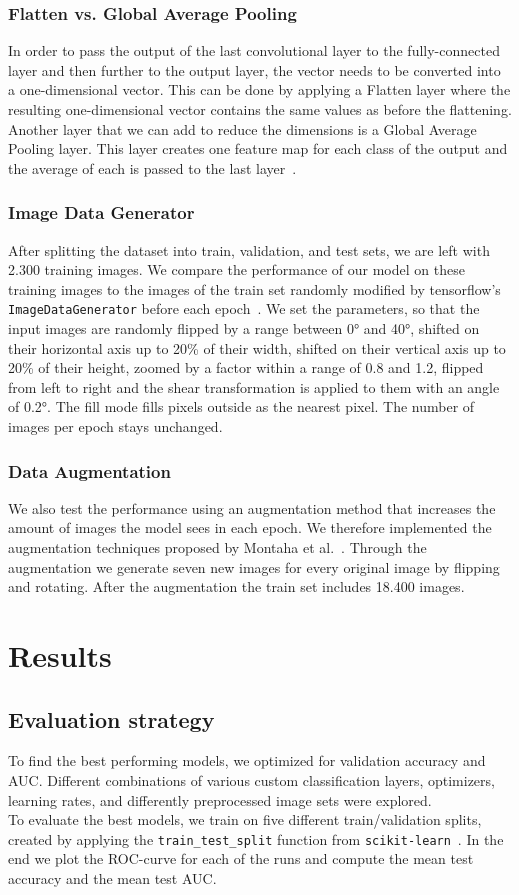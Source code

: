 \documentclass[sn-mathphys,Numbered]{sn-jnl}%
\theoremstyle{thmstyleone}%
\theoremstyle{thmstyletwo}%
\theoremstyle{thmstylethree}%
\begin{document}
\subsubsection{Flatten vs. Global Average Pooling}
\label{fullyConnected}
In order to pass the output of the last convolutional layer to the fully-connected layer and then further to the output layer, the vector needs to be converted into a one-dimensional vector. This can be done by applying a Flatten layer where the resulting one-dimensional vector contains the same values as before the flattening. Another layer that we can add to reduce the dimensions is a Global Average Pooling layer. This layer creates one feature map for each class of the output and the average of each is passed to the last layer~\cite{Admin_2023}.
\subsubsection{Image Data Generator}
\label{ImageDataGenerator}
After splitting the dataset into train, validation, and test sets, we are left with 2.300 training images. We compare the performance of our model on these training images to the images of the train set randomly modified by tensorflow's \verb|ImageDataGenerator| before each epoch~\cite{IDG}. We set the parameters, so that the input images are randomly flipped by a range between 0° and 40°, shifted on their horizontal axis up to 20\% of their width, shifted on their vertical axis up to 20\% of their height, zoomed by a factor within a range of 0.8 and 1.2, flipped from left to right and the shear transformation is applied to them with an angle of 0.2°. The fill mode fills pixels outside as the nearest pixel. The number of images per epoch stays unchanged.
\subsubsection{Data Augmentation}
\label{DataAugmentation}
We also test the performance using an augmentation method that increases the amount of images the model sees in each epoch. We therefore implemented the augmentation techniques proposed by Montaha et al.~\cite{Montaha2021}. Through the augmentation we generate seven new images for every original image by flipping and rotating. After the augmentation the train set includes 18.400 images.
\section{Results}
\label{Results}
\subsection{Evaluation strategy}
\label{CV_Results}
To find the best performing models, we optimized for validation accuracy and AUC. Different combinations of various custom classification layers, optimizers, learning rates, and differently preprocessed image sets were explored.\\
To evaluate the best models, we train on five different train/validation splits, created by applying the \verb|train_test_split| function from \verb|scikit-learn|~\cite{TTS}. In the end we plot the ROC-curve for each of the runs and compute the mean test accuracy and the mean test AUC.
\end{document}

